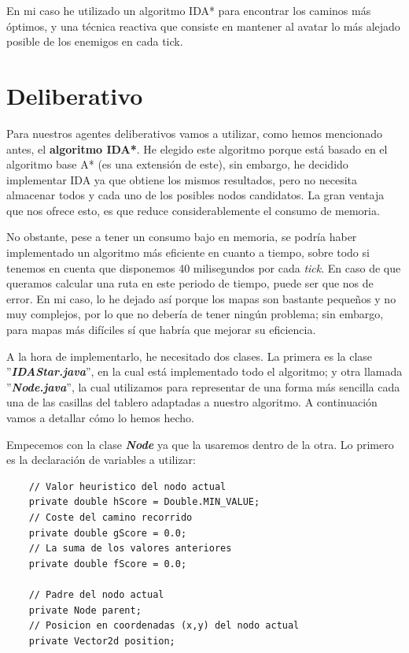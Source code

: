 \documentclass[11pt,a4paper]{article}
\begin{document}
En mi caso he utilizado un algoritmo IDA* para encontrar los caminos más óptimos, y una técnica reactiva
que consiste en mantener al avatar lo más alejado posible de los enemigos en cada tick.


\section{Deliberativo}

Para nuestros agentes deliberativos vamos a utilizar, como hemos mencionado antes, el \textbf{algoritmo IDA*}.
He elegido este algoritmo porque está basado en el algoritmo base A* (es una extensión de este), sin embargo,
he decidido implementar IDA ya que obtiene los mismos resultados, pero no necesita almacenar todos y cada uno
de los posibles nodos candidatos. La gran ventaja que nos ofrece esto, es que reduce considerablemente el
consumo de memoria.

No obstante, pese a tener un consumo bajo en memoria, se podría haber implementado un algoritmo más eficiente
en cuanto a tiempo, sobre todo si tenemos en cuenta que disponemos 40 milisegundos por cada \textit{tick}. En
caso de que queramos calcular una ruta en este periodo de tiempo, puede ser que nos de error. En mi caso,
lo he dejado así porque los mapas son bastante pequeños y no muy complejos, por lo que no debería de tener
ningún problema; sin embargo, para mapas más difíciles sí que habría que mejorar su eficiencia.

A la hora de implementarlo, he necesitado dos clases. La primera es la clase ''\textbf{\textit{IDAStar.java}}'',
en la cual está implementado todo el algoritmo; y otra llamada ''\textbf{\textit{Node.java}}'', la cual
utilizamos para representar de una forma más sencilla cada una de las casillas del tablero adaptadas a nuestro
algoritmo. A continuación vamos a detallar cómo lo hemos hecho.

Empecemos con la clase \textbf{\textit{Node}} ya que la usaremos dentro de la otra. Lo primero es la declaración de
variables a utilizar:
\newline
\begin{lstlisting}
    // Valor heuristico del nodo actual
    private double hScore = Double.MIN_VALUE;
    // Coste del camino recorrido
    private double gScore = 0.0;
    // La suma de los valores anteriores
    private double fScore = 0.0;

    // Padre del nodo actual
    private Node parent;
    // Posicion en coordenadas (x,y) del nodo actual
    private Vector2d position;
\end{lstlisting}
\end{document}
